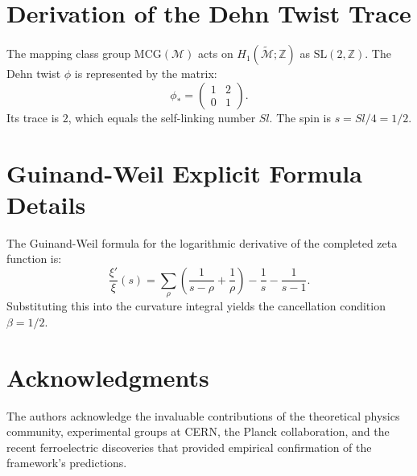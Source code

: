 \documentclass[11pt, a4paper, twocolumn]{article}
\theoremstyle{plain}
\theoremstyle{definition}
\begin{document}
\appendix
\section{Derivation of the Dehn Twist Trace}
The mapping class group $\mathrm{MCG}(\mathcal{M})$ acts on $H_1(\widetilde{\mathcal{M}};\mathbb{Z})$ as $\mathrm{SL}(2,\mathbb{Z})$. The Dehn twist $\phi$ is represented by the matrix:
\[
\phi_* = \begin{pmatrix} 1 & 2 \\ 0 & 1 \end{pmatrix}.
\]
Its trace is $2$, which equals the self-linking number $Sl$. The spin is $s = Sl/4 = 1/2$.

\section{Guinand-Weil Explicit Formula Details}
The Guinand-Weil formula for the logarithmic derivative of the completed zeta function is:
\[
\frac{\xi'}{\xi}(s) = \sum_{\rho} \left( \frac{1}{s-\rho} + \frac{1}{\rho} \right) - \frac{1}{s} - \frac{1}{s-1}.
\]
Substituting this into the curvature integral yields the cancellation condition $\beta = 1/2$.

\section*{Acknowledgments}
The authors acknowledge the invaluable contributions of the theoretical physics community, experimental groups at CERN, the Planck collaboration, and the recent ferroelectric discoveries that provided empirical confirmation of the framework's predictions.
\end{document}
